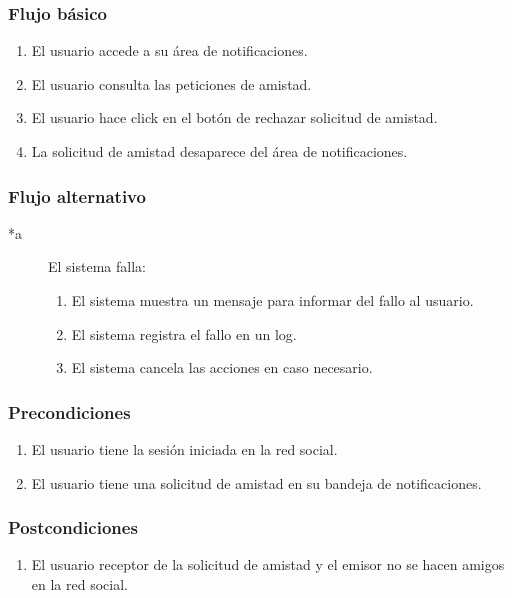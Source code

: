 \documentclass[12pt, a4paper, titlepage]{article}
\begin{document}
\subsubsection{Flujo básico}
\begin{enumerate}
	\item El usuario accede a su área de notificaciones.
	\item El usuario consulta las peticiones de amistad.
	\item El usuario hace click en el botón de rechazar solicitud de amistad.
	\item La solicitud de amistad desaparece del área de notificaciones.
\end{enumerate}
\subsubsection{Flujo alternativo}
\begin{description}
	\item [*a] El sistema falla:
	\begin{enumerate}
		\item El sistema muestra un mensaje para informar del fallo al usuario.
		\item El sistema registra el fallo en un log.
		\item El sistema cancela las acciones en caso necesario.
	\end{enumerate}
\end{description}

\subsubsection{Precondiciones}
\begin{enumerate}
	\item El usuario tiene la sesión iniciada en la red social.
	\item El usuario tiene una solicitud de amistad en su bandeja de notificaciones.
\end{enumerate}
\subsubsection{Postcondiciones}
\begin{enumerate}
	\item El usuario receptor de la solicitud de amistad y el emisor no se hacen amigos en la red social.
\end{enumerate}

\end{document}
